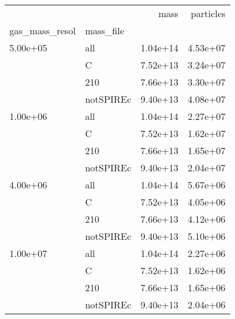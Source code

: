 \begin{tabular}{llrr}
\toprule
         &           &     mass &  particles \\
gas\_mass\_resol & mass\_file &          &            \\
\midrule
5.00e+05 & all & 1.04e+14 &   4.53e+07 \\
         & C & 7.52e+13 &   3.24e+07 \\
         & 210 & 7.66e+13 &   3.30e+07 \\
         & notSPIREc & 9.40e+13 &   4.08e+07 \\
1.00e+06 & all & 1.04e+14 &   2.27e+07 \\
         & C & 7.52e+13 &   1.62e+07 \\
         & 210 & 7.66e+13 &   1.65e+07 \\
         & notSPIREc & 9.40e+13 &   2.04e+07 \\
4.00e+06 & all & 1.04e+14 &   5.67e+06 \\
         & C & 7.52e+13 &   4.05e+06 \\
         & 210 & 7.66e+13 &   4.12e+06 \\
         & notSPIREc & 9.40e+13 &   5.10e+06 \\
1.00e+07 & all & 1.04e+14 &   2.27e+06 \\
         & C & 7.52e+13 &   1.62e+06 \\
         & 210 & 7.66e+13 &   1.65e+06 \\
         & notSPIREc & 9.40e+13 &   2.04e+06 \\
\bottomrule
\end{tabular}
